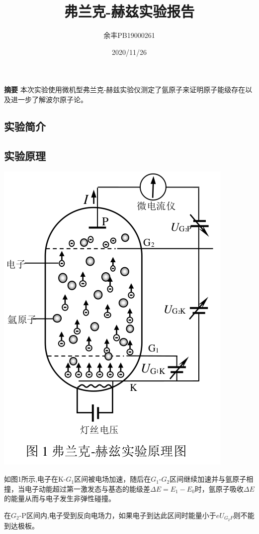 \documentclass[UEF8]{ctexart}
\title{弗兰克-赫兹实验报告}
\author{余丰\quad PB19000261}
\date{2020/11/26}
\begin{document}
\maketitle
{\bfseries 摘要} \quad 本次实验使用微机型弗兰克-赫兹实验仪测定了氩原子来证明原子能级存在以及进一步了解波尔原子论。

\begin{multicols}{2}
\section{实验简介}
\subsection{实验原理}
\includegraphics[scale=0.42]{p1.png}

 如图1所示,电子在K-$G_{1}$区间被电场加速，随后在$G_{1}$-$G_{2}$区间继续加速并与氩原子相撞，当电子动能超过第一激发态与基态的能级差$\Delta{E}=E_{1}-E_{0}$时，氩原子吸收$\Delta{E}$的能量从而与电子发生非弹性碰撞。


在$G_{2}$-P区间内,电子受到反向电场力，如果电子到达此区间时能量小于$eU_{G_{2}P}$则不能到达极板。


\end{multicols}
\end{document}
